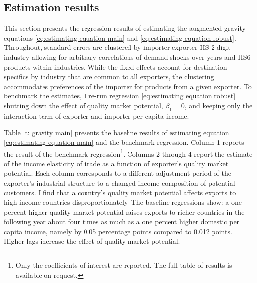\documentclass[12pt,a4paper,oneside,times]{article}   	%
\begin{document}



%
\subsection{Estimation results}
This section presents the regression results of estimating the augmented gravity equations \eqref{eq:estimating equation main} and \eqref{eq:estimating equation robust}. 
Throughout, standard errors are clustered by importer-exporter-HS 2-digit industry allowing for arbitrary correlations of demand shocks over years and HS6 products within industries. While the fixed effects account for destination specifics by industry that are common to all exporters, the clustering accommodates preferences of the importer for products from a given exporter. To benchmark the estimates, I re-run regression \eqref{eq:estimating equation robust}  shutting down the effect of quality market potential, $\beta_1=0$, and keeping only the interaction term of exporter and importer per capita income. 

Table \ref{t: gravity main} presents the baseline results of estimating equation \eqref{eq:estimating equation main} and the benchmark regression. Column 1 reports the result of the benchmark regression\footnote{Only the coefficients of interest are reported. The full table of results is available on request.}. Columns 2 through 4 report the estimate of the income elasticity of trade as a function of exporter's quality market potential. Each column corresponds to a different adjustment period of the exporter's industrial structure to a changed income composition of potential customers. I find that a country's quality market potential affects exports to high-income countries disproportionately. The baseline regressions show: a one percent higher quality market potential raises exports to richer countries in the following year about four times as much as a one percent higher domestic per capita income, namely by 0.05 percentage points compared to 0.012 points. Higher lags  increase the effect of quality market potential.
\end{document}
